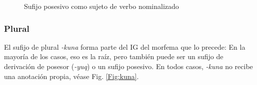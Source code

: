 \documentclass[a4paper,11pt,DIV12]{scrartcl}
\begin{document}
\begin{figure}
 \begin{center}
\end{center}
\caption{Sufijo posesivo como sujeto de verbo nominalizado}\label{Fig:s.poss.subj}
\end{figure}



\subsubsection{Plural}
El sufijo de plural \textit{-kuna} forma parte del IG del morfema que lo precede: En la mayor\'ia de los casos, eso es la ra\'iz, pero tambi\'en puede ser un sufijo de derivaci\'on de posesor ({\em -yuq}) o un sufijo posesivo. En todos casos, {\em -kuna} no recibe una anotaci\'on propia, v\'ease Fig. \ref{Fig:kuna}.
\end{document}

